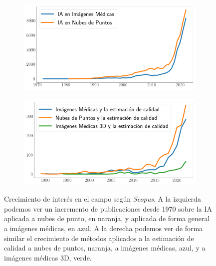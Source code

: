 \begin{figure}[H]
  \centering
  \begin{subfigure}{0.49\textwidth}
    \includegraphics[width=\textwidth]{imagenes/chapter3/ScopusMLinMedicineAndPC.png}
  \end{subfigure}
  \begin{subfigure}{0.5\textwidth}
    \includegraphics[width=\textwidth]{imagenes/chapter3/ScopusQualityAssessment.png}
  \end{subfigure}
  \caption[Crecimiento de interés en el campo según \emph{Scopus}]{Crecimiento de interés en el campo según \emph{Scopus}\footnotemark[1].
  A la izquierda podemos ver un incremento de publicaciones desde 
  1970 sobre la IA aplicada a nubes de punto, en naranja, 
  y aplicada de forma general a imágenes médicas, en azul. A la derecha 
  podemos ver de forma similar el crecimiento de métodos aplicados
  a la estimación de calidad a nubes de puntos, naranja, a imágenes médicas, azul, y 
  a imágenes médicas 3D, verde.
  }
  \label{fig:ScopusMLinMedicalAndPC}
\end{figure}

